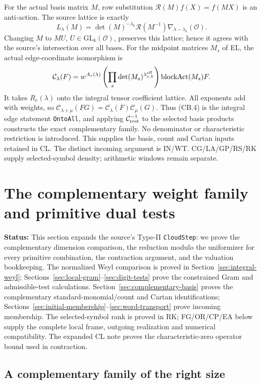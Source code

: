 \documentclass[11pt,a4paper]{article}
\numberwithin{equation}{section}
\theoremstyle{remark}\newtheorem{remark}[theorem]{Remark}
\newcommand{\status}[1]{\textbf{Status:} #1}
\begin{document}
For the actual basis matrix $M$, row substitution $\mathcal R(M)f(X)=f(MX)$ is an anti-action. The source lattice is exactly
\[
 L_\lambda(M)=\det(M)^{-\lambda_k}\mathcal R(M^{-1})\nabla_{\lambda-\lambda_k}(\mathcal O).
\]
Changing $M$ to $MU$, $U\in\mathrm{GL}_k(\mathcal O)$, preserves this lattice; hence it agrees with the source's intersection over all bases.
For the midpoint matrices $M_s$ of EL, the actual edge-coordinate isomorphism is
\[
 \mathcal C_\lambda(F)=w^{A_r(\lambda)}
 \left(\prod_s\det(M_s)^{\lambda^{\rm eff}_{s,k}}\right)
 \operatorname{blockAct}(M_s)F.
\]
It takes $R_e(\lambda)$ onto the integral tensor coefficient lattice.
All exponents add with weights, so
$\mathcal C_{\lambda+\mu}(FG)=\mathcal C_\lambda(F)\mathcal C_\mu(G)$.
Thus (CB.4) is the integral edge statement \texttt{OntoAll}, and applying
$\mathcal C_{\rm rest}^{-1}$ to the selected basis products constructs the exact complementary family.
No denominator or characteristic restriction is introduced.
This supplies the basis, count and Cartan inputs retained in CL.
The distinct incoming argument is IN/WT. CG/LA/GP/RS/RK supply selected-symbol density; arithmetic windows remain separate.

\section{The complementary weight family and primitive dual tests}
\label{sec:cloud}

\status{This section expands the source's Type-II \texttt{CloudStep}: we prove the complementary dimension comparison, the reduction modulo the uniformizer for every primitive combination, the contraction argument, and the valuation bookkeeping. The normalized Weyl comparison is proved in Section~\ref{sec:integral-weyl}; Sections~\ref{sec:local-gram}--\ref{sec:digit-tests} prove the constrained Gram and admissible-test calculations. Section~\ref{sec:complementary-basis} proves the complementary standard-monomial/count and Cartan identifications; Sections~\ref{sec:initial-membership}--\ref{sec:word-transport} prove incoming membership. The selected-symbol rank is proved in RK; FG/OR/CP/EA below supply the complete local frame, outgoing realization and numerical compatibility. The expanded CL note proves the characteristic-zero operator bound used in contraction.}

\subsection{A complementary family of the right size}
\end{document}
